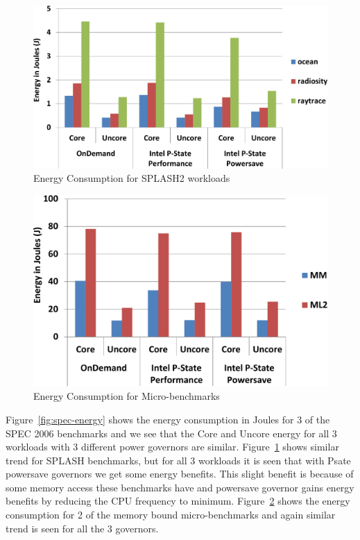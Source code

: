 \begin{figure}
  \begin{center}
\includegraphics[width=\linewidth]{figs/def-drivers-splash-crop.pdf}
  \end{center}
  \vspace{-0.1in}
  \caption{Energy Consumption for SPLASH2 workloads}
  \label{fig:splash-energy}
\end{figure}


\begin{figure}[h]
  \begin{center}
\includegraphics[width=\linewidth]{figs/def-drivers-micro-crop.pdf}
  \end{center}
  \vspace{-0.1in}
  \caption{Energy Consumption for Micro-benchmarks}
	\label{fig:micro-energy}
\end{figure}


Figure~\ref{fig:spec-energy} shows the energy consumption in Joules for 3 of the SPEC 2006
benchmarks and we see that the Core and Uncore energy for all 3 workloads with 3 different
power governors are similar. 
Figure~\ref{fig:splash-energy} shows similar trend for SPLASH benchmarks,
but for all 3 workloads it is seen that with Psate powersave governors we get some energy benefits.
This slight benefit is because of some memory access these benchmarks have and powersave governor
gains energy benefits by reducing the CPU frequency to minimum. 
Figure~\ref{fig:micro-energy} shows
the energy consumption for 2 of the memory bound micro-benchmarks and again similar trend is seen
for all the 3 governors.

